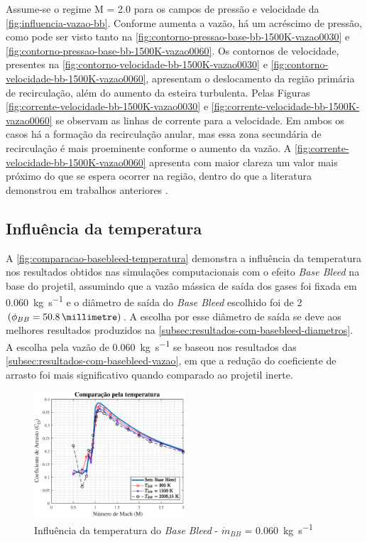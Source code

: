 Assume-se o regime M = \num{2,0} para os campos de pressão e velocidade da \autoref{fig:influencia-vazao-bb}. Conforme aumenta a vazão, há um acréscimo de pressão, como pode ser visto tanto na \autoref{fig:contorno-pressao-base-bb-1500K-vazao0030} e \autoref{fig:contorno-pressao-base-bb-1500K-vazao0060}. Os contornos de velocidade, presentes na \autoref{fig:contorno-velocidade-bb-1500K-vazao0030} e \autoref{fig:contorno-velocidade-bb-1500K-vazao0060}, apresentam o deslocamento da região primária de recirculação, além do aumento da esteira turbulenta. Pelas Figuras \ref{fig:corrente-velocidade-bb-1500K-vazao0030} e \ref{fig:corrente-velocidade-bb-1500K-vazao0060} se observam as linhas de corrente para a velocidade. Em ambos os casos há a formação da recirculação anular, mas essa zona secundária de recirculação é mais proeminente conforme o aumento da vazão. A \autoref{fig:corrente-velocidade-bb-1500K-vazao0060} apresenta com maior clareza um valor mais próximo do que se espera ocorrer na região, dentro do que a literatura demonstrou em trabalhos anteriores \cite{Sahu1985,Andersson1976}.

\subsection{Influência da temperatura} \label{subsec:resultados-com-basebleed-temperatura}

A \autoref{fig:comparacao-basebleed-temperatura} demonstra a influência da temperatura nos resultados obtidos nas simulações computacionais com o efeito \textit{Base Bleed} na base do projetil, assumindo que a vazão mássica de saída dos gases foi fixada em \qty{0,060}{\kilogram\per\second} e o diâmetro de saída do \textit{Base Bleed} escolhido foi de \qty{2}{\polegada} \(\left(\phi_{BB} = \qty{50,8}{\millimetre}\right)\). A escolha por esse diâmetro de saída se deve aos melhores resultados produzidos na \autoref{subsec:resultados-com-basebleed-diametros}. A escolha pela vazão de \qty{0,060}{\kilogram\per\second} se baseou nos resultados das \autoref{subsec:resultados-com-basebleed-vazao}, em que a redução do coeficiente de arrasto foi mais significativo quando comparado ao projetil inerte.

\begin{figure}[!ht]
	\centering
	\includegraphics[width=0.5\textwidth]{cd-combasebleed-vazao006-2pol.eps}
	\caption{Influência da temperatura do \textit{Base Bleed} - \(\Dot{m}_{BB}\) = \qty{0,060}{\kilogram\per\second}}
	\label{fig:comparacao-basebleed-temperatura}
\end{figure}

